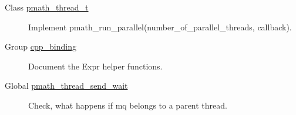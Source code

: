 \label{todo__todo000004}
\hypertarget{todo__todo000004}{}
 \begin{description}
\item[Class \hyperlink{classpmath__thread__t}{pmath\_\-thread\_\-t} ]Implement pmath\_\-run\_\-parallel(number\_\-of\_\-parallel\_\-threads, callback). \end{description}


\label{todo__todo000001}
\hypertarget{todo__todo000001}{}
 \begin{description}
\item[Group \hyperlink{group__cpp__binding}{cpp\_\-binding} ]Document the Expr helper functions.

\end{description}


\label{todo__todo000002}
\hypertarget{todo__todo000002}{}
 \begin{description}
\item[Global \hyperlink{group__threadmsg_g0466f7731e5e7cc3c4361f9512795a1c}{pmath\_\-thread\_\-send\_\-wait} ]Check, what happens if mq belongs to a parent thread. \end{description}
